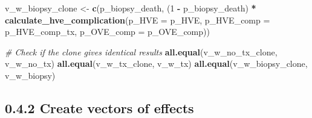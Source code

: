 \documentclass[
]{article}
\newenvironment{Shaded}{\begin{snugshade}}{\end{snugshade}}
\newcommand{\AttributeTok}[1]{\textcolor[rgb]{0.13,0.29,0.53}{#1}}
\newcommand{\CommentTok}[1]{\textcolor[rgb]{0.56,0.35,0.01}{\textit{#1}}}
\newcommand{\DecValTok}[1]{\textcolor[rgb]{0.00,0.00,0.81}{#1}}
\newcommand{\FunctionTok}[1]{\textcolor[rgb]{0.13,0.29,0.53}{\textbf{#1}}}
\newcommand{\NormalTok}[1]{#1}
\newcommand{\OtherTok}[1]{\textcolor[rgb]{0.56,0.35,0.01}{#1}}
\newcommand{\SpecialCharTok}[1]{\textcolor[rgb]{0.81,0.36,0.00}{\textbf{#1}}}
\begin{document}
\begin{Shaded}
\begin{Highlighting}[]
\NormalTok{v\_w\_biopsy\_clone }\OtherTok{\textless{}{-}} \FunctionTok{c}\NormalTok{(p\_biopsy\_death,  }
\NormalTok{                    (}\DecValTok{1} \SpecialCharTok{{-}}\NormalTok{ p\_biopsy\_death) }\SpecialCharTok{*}  \FunctionTok{calculate\_hve\_complication}\NormalTok{(}\AttributeTok{p\_HVE =}\NormalTok{ p\_HVE, }\AttributeTok{p\_HVE\_comp =}\NormalTok{ p\_HVE\_comp\_tx, }\AttributeTok{p\_OVE\_comp =}\NormalTok{ p\_OVE\_comp))}
                      
\CommentTok{\# Check if the clone gives identical results   }
\FunctionTok{all.equal}\NormalTok{(v\_w\_no\_tx\_clone, v\_w\_no\_tx)}
\FunctionTok{all.equal}\NormalTok{(v\_w\_tx\_clone, v\_w\_tx)}
\FunctionTok{all.equal}\NormalTok{(v\_w\_biopsy\_clone, v\_w\_biopsy)}
\end{Highlighting}
\end{Shaded}

\hypertarget{create-vectors-of-effects}{%
\subsection{0.4.2 Create vectors of
effects}\label{create-vectors-of-effects}}
\end{document}
